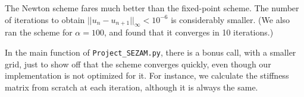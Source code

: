 \documentclass[11pt, a4paper, twoside]{article}
\begin{document}
The Newton scheme fares much better than the fixed-point scheme. The number of iterations to obtain $||u_n -u_{n+1}||_\infty < 10^{-6}$ is considerably smaller. (We also ran the scheme for $\alpha=100$, and found that it converges in 10 iterations.)

In the main function of \verb+Project_SEZAM.py+, there is a bonus call, with a smaller grid, just to show off that the scheme converges quickly, even though our implementation is not optimized for it. For instance, we calculate the stiffness matrix from scratch at each iteration, although it is always the same.

\end{document}
